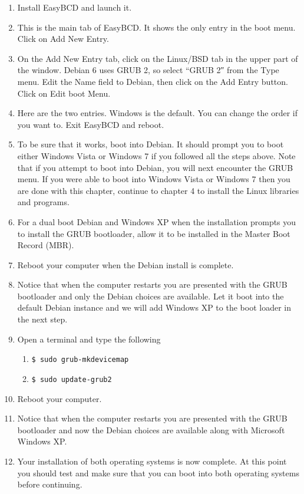 \documentclass[12pt,notitlepage,onecolumn,oneside,openany]{memoir}
\begin{document}
\begin{enumerate}
\item \textsf{Install EasyBCD and launch it.}
 
\item \textsf{This is the main tab of EasyBCD. It shows the only entry in the boot menu. Click on Add New Entry.} 

\item \textsf{On the Add New Entry tab, click on the Linux/BSD tab in the upper part of the window. Debian 6 uses GRUB 2, so select “GRUB 2″ from the Type menu. Edit the Name field to Debian, then click on the Add Entry button. Click on Edit boot Menu.}
 
\item \textsf{Here are the two entries. Windows is the default. You can change the order if you want to. Exit EasyBCD and reboot.} 

\item \textsf{To be sure that it works, boot into Debian. It should prompt you to boot either Windows Vista or Windows 7 if you followed all the steps above. Note that if you attempt to boot into Debian, you will next encounter the GRUB menu.  If you were able to boot into Windows Vista or Windows 7 then you are done with this chapter, continue to chapter 4 to install the Linux libraries and programs.}

\item \textsf{For a dual boot Debian and Windows XP when the installation prompts you to install the GRUB bootloader, allow it to be installed in the Master Boot Record (MBR).}

\item \textsf{Reboot your computer when the Debian install is complete.}

\item \textsf{Notice that when the computer restarts you are presented with the GRUB bootloader and only the Debian choices are available.  Let it boot into the default Debian instance and we will add Windows XP to the boot loader in the next step.}

\item \textsf{Open a terminal and type the following}
      \begin{enumerate}
      \item \texttt{\$ sudo grub-mkdevicemap}
      \item \texttt{\$ sudo update-grub2}
      \end{enumerate}
      
\item \textsf{Reboot your computer.}

\item \textsf{Notice that when the computer restarts you are presented with the GRUB bootloader and now the Debian choices are available along with Microsoft Windows XP.}

\item \textsf{Your installation of both operating systems is now complete.  At this point you should test and make sure that you can boot into both operating systems before continuing.}
\end{enumerate}
\end{document}
